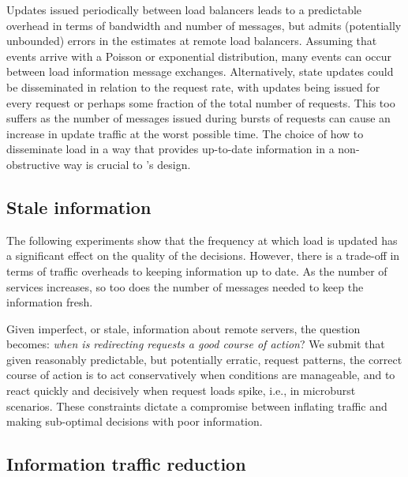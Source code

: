Updates issued periodically between load balancers leads to a
predictable overhead in terms of bandwidth and number of messages, but
admits (potentially unbounded) errors in the estimates at remote load
balancers. 
%
Assuming that events arrive with a Poisson or exponential
distribution, many events can occur between load information message
exchanges.  
%
Alternatively, state updates could be disseminated in relation to the request rate, with updates being issued for every request or perhaps some fraction of the total number of requests. 
%
This too suffers as the number of messages issued during bursts of requests
can cause an increase in update traffic at the worst possible
time. 
%
The choice of how to disseminate load in a way that provides
up-to-date information in a non-obstructive way is crucial to \daronpon's design.


\subsection{Stale information}

The following experiments show that the frequency at which load is updated has a
significant effect on the quality of the decisions. 
%
However, there is a trade-off in terms of traffic overheads to keeping information up 
to date. 
%
As the number of services increases, so too does the number of messages needed to
keep the information fresh. 

Given imperfect, or stale, information about remote servers, the
question becomes: \textit{when is redirecting requests a good course of action}? 
%  
We submit that given reasonably predictable, but
potentially erratic, request patterns, the correct course of action
is to act conservatively when conditions are manageable, and to react
quickly and decisively when request loads spike, i.e., in microburst
scenarios.  
%
These constraints dictate a compromise between inflating traffic and making sub-optimal decisions with poor information.

\subsection{Information traffic reduction} 


